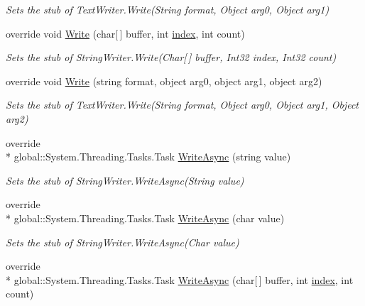 \begin{DoxyCompactItemize}
\begin{DoxyCompactList}\small\item\em Sets the stub of Text\-Writer.\-Write(\-String format, Object arg0, Object arg1)\end{DoxyCompactList}\item 
override void \hyperlink{class_system_1_1_i_o_1_1_fakes_1_1_stub_string_writer_a6bc96b5fc57a2ef6d5dd1560a2eb20fa}{Write} (char\mbox{[}$\,$\mbox{]} buffer, int \hyperlink{jquery-1_810_82-vsdoc_8js_a75bb12d1f23302a9eea93a6d89d0193e}{index}, int count)
\begin{DoxyCompactList}\small\item\em Sets the stub of String\-Writer.\-Write(\-Char\mbox{[}$\,$\mbox{]} buffer, Int32 index, Int32 count)\end{DoxyCompactList}\item 
override void \hyperlink{class_system_1_1_i_o_1_1_fakes_1_1_stub_string_writer_aa6e84131c2d2ced1f8c4fa5243021334}{Write} (string format, object arg0, object arg1, object arg2)
\begin{DoxyCompactList}\small\item\em Sets the stub of Text\-Writer.\-Write(\-String format, Object arg0, Object arg1, Object arg2)\end{DoxyCompactList}\item 
override \\*
global\-::\-System.\-Threading.\-Tasks.\-Task \hyperlink{class_system_1_1_i_o_1_1_fakes_1_1_stub_string_writer_a617e89474b487fe563ca971d94534682}{Write\-Async} (string value)
\begin{DoxyCompactList}\small\item\em Sets the stub of String\-Writer.\-Write\-Async(\-String value)\end{DoxyCompactList}\item 
override \\*
global\-::\-System.\-Threading.\-Tasks.\-Task \hyperlink{class_system_1_1_i_o_1_1_fakes_1_1_stub_string_writer_adceaecf30de0144b311ed64e4adfb838}{Write\-Async} (char value)
\begin{DoxyCompactList}\small\item\em Sets the stub of String\-Writer.\-Write\-Async(\-Char value)\end{DoxyCompactList}\item 
override \\*
global\-::\-System.\-Threading.\-Tasks.\-Task \hyperlink{class_system_1_1_i_o_1_1_fakes_1_1_stub_string_writer_a1a0fe8a69349157f5778bc98c8f3a60d}{Write\-Async} (char\mbox{[}$\,$\mbox{]} buffer, int \hyperlink{jquery-1_810_82-vsdoc_8js_a75bb12d1f23302a9eea93a6d89d0193e}{index}, int count)

\end{DoxyCompactItemize}
